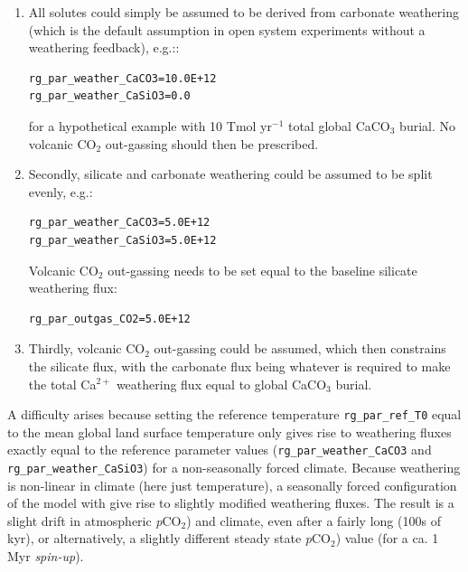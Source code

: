 \documentclass[11pt,fleqn]{book} %
\begin{document}
\begin{enumerate}
        
\item All solutes could simply be assumed to be derived from carbonate weathering (which is the default assumption in open system experiments without a weathering feedback), e.g.::
\vspace{-1mm}\begin{verbatim}
rg_par_weather_CaCO3=10.0E+12
rg_par_weather_CaSiO3=0.0
\end{verbatim}\vspace{-1mm}
for a hypothetical example with 10 Tmol yr$^{-1}$ total global CaCO$_{3}$ burial. No volcanic CO$_{2}$ out-gassing should then be prescribed.
\item Secondly, silicate and carbonate weathering could be assumed to be split evenly, e.g.:
\vspace{-1mm}\begin{verbatim}
rg_par_weather_CaCO3=5.0E+12
rg_par_weather_CaSiO3=5.0E+12
\end{verbatim}\vspace{-1mm}
Volcanic CO$_{2}$ out-gassing needs to be set equal to the baseline silicate weathering flux:
\vspace{-1mm}\begin{verbatim}
rg_par_outgas_CO2=5.0E+12
\end{verbatim}\vspace{-1mm}
\item Thirdly, volcanic CO$_{2}$ out-gassing could be assumed, which then constrains the silicate flux, with the carbonate flux being whatever is required to make the total Ca$^{2+}$ weathering flux equal to global CaCO$_{3}$ burial.

\end{enumerate}

A difficulty arises because setting the reference temperature \texttt{rg\_par\_ref\_T0} equal to the mean global land surface temperature only gives rise to weathering fluxes exactly equal to the reference parameter values (\texttt{rg\_par\_weather\_CaCO3} and \texttt{rg\_par\_weather\_CaSiO3}) for a non-seasonally forced climate. Because weathering is non-linear in climate (here just temperature), a seasonally forced configuration of the model with give rise to slightly modified weathering fluxes. The result is a slight drift in atmospheric \textit{p}CO${_2}$) and climate, even after a fairly long (100s of kyr), or alternatively, a slightly different steady state \textit{p}CO${_2}$) value (for a ca. 1 Myr \textit{spin-up}).
\end{document}
